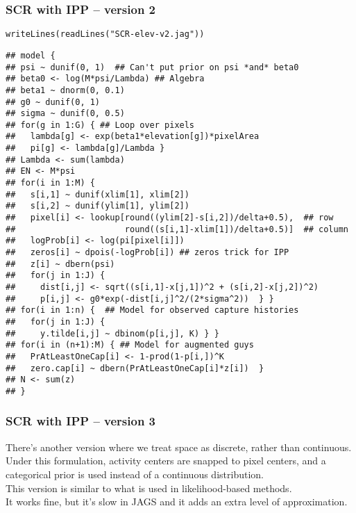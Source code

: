 \documentclass[color=usenames,dvipsnames]{beamer}\usepackage[]{graphicx}\usepackage[]{color}
\makeatletter
\newcommand{\hlstr}[1]{\textcolor[rgb]{0.749,0.012,0.012}{#1}}%
\newcommand{\hlstd}[1]{\textcolor[rgb]{0,0,0}{#1}}%
\newcommand{\hlkwd}[1]{\textcolor[rgb]{0.004,0.004,0.506}{#1}}%
\newenvironment{kframe}{%
 \def\at@end@of@kframe{}%
 \ifinner\ifhmode%
  \def\at@end@of@kframe{\end{minipage}}%
  \begin{minipage}{\columnwidth}%
 \fi\fi%
 \def\FrameCommand##1{\hskip\@totalleftmargin \hskip-\fboxsep
 \colorbox{shadecolor}{##1}\hskip-\fboxsep
     \hskip-\linewidth \hskip-\@totalleftmargin \hskip\columnwidth}%
 \MakeFramed {\advance\hsize-\width
   \@totalleftmargin\z@ \linewidth\hsize
   \@setminipage}}%
 {\par\unskip\endMakeFramed%
 \at@end@of@kframe}
\newenvironment{knitrout}{}{} %
\makeatother
\begin{document}
\begin{frame}[fragile]
  \frametitle{SCR with IPP -- version 2}
\vspace{-3pt}
\begin{knitrout}\tiny
{}\color{fgcolor}\begin{kframe}
\begin{alltt}
\hlkwd{writeLines}\hlstd{(}\hlkwd{readLines}\hlstd{(}\hlstr{"SCR-elev-v2.jag"}\hlstd{))}
\end{alltt}
\begin{verbatim}
## model {
## psi ~ dunif(0, 1)  ## Can't put prior on psi *and* beta0
## beta0 <- log(M*psi/Lambda) ## Algebra
## beta1 ~ dnorm(0, 0.1)
## g0 ~ dunif(0, 1)
## sigma ~ dunif(0, 0.5)
## for(g in 1:G) { ## Loop over pixels
##   lambda[g] <- exp(beta1*elevation[g])*pixelArea
##   pi[g] <- lambda[g]/Lambda }
## Lambda <- sum(lambda)
## EN <- M*psi
## for(i in 1:M) {
##   s[i,1] ~ dunif(xlim[1], xlim[2]) 
##   s[i,2] ~ dunif(ylim[1], ylim[2])
##   pixel[i] <- lookup[round((ylim[2]-s[i,2])/delta+0.5),  ## row
##                      round((s[i,1]-xlim[1])/delta+0.5)]  ## column
##   logProb[i] <- log(pi[pixel[i]])
##   zeros[i] ~ dpois(-logProb[i]) ## zeros trick for IPP
##   z[i] ~ dbern(psi)
##   for(j in 1:J) {
##     dist[i,j] <- sqrt((s[i,1]-x[j,1])^2 + (s[i,2]-x[j,2])^2)
##     p[i,j] <- g0*exp(-dist[i,j]^2/(2*sigma^2))  } }
## for(i in 1:n) {  ## Model for observed capture histories
##   for(j in 1:J) {
##     y.tilde[i,j] ~ dbinom(p[i,j], K) } }
## for(i in (n+1):M) { ## Model for augmented guys
##   PrAtLeastOneCap[i] <- 1-prod(1-p[i,])^K
##   zero.cap[i] ~ dbern(PrAtLeastOneCap[i]*z[i])  }
## N <- sum(z)
## }
\end{verbatim}
\end{kframe}
\end{knitrout}
\end{frame}



\begin{frame}
  \frametitle{SCR with IPP -- version 3}
  There's another version where we treat space as discrete, rather
  than continuous. \\
  \pause \vfill
  Under this formulation, activity centers are snapped to pixel
  centers, and a categorical prior is used instead of a continuous
  distribution. \\
  \pause \vfill
  This version is similar to what is used in likelihood-based
  methods. \\
  \pause \vfill
  It works fine, but it's slow in JAGS and it adds an extra level of
  approximation. \\
\end{frame}
\end{document}
